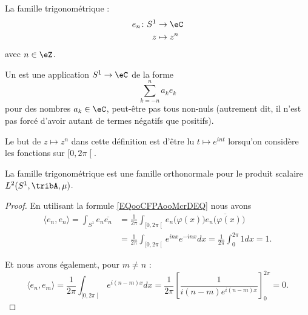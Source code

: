 \begin{definition}
    La famille trigonométrique :
    \begin{equation}
        \begin{aligned}
            e_n\colon S^1&\to \eC \\
            z&\mapsto z^n
        \end{aligned}
    \end{equation}
    avec \( n\in \eZ\).

    Un  est une application \( S^1\to \eC\) de la forme
    \begin{equation}
        \sum_{k=-n}^na_ke_k
    \end{equation}
    pour des nombres \( a_k\in \eC\), peut-être pas tous non-nuls (autrement dit, il n'est pas forcé d'avoir autant de termes négatifs que positifs).
\end{definition}
Le but de \( z\mapsto z^n\) dans cette définition est d'être lu \(  t\mapsto e^{in t}\) lorsqu'on considère les fonctions sur \( \mathopen[ 0 , 2\pi \mathclose[\).

\begin{proposition}
    La famille trigonométrique est une famille orthonormale pour le produit scalaire \( L^2(S^1,\tribA,\mu)\).
\end{proposition}

\begin{proof}
    En utilisant la formule \eqref{EQooCFPAooMcrDEQ} nous avons
    \begin{subequations}
        \begin{align}
            \langle e_n, e_n\rangle =\int_{S^1}e_n\overline{ e_n }&=\frac{1}{ 2\pi }\int_{\mathopen[ 0 , 2\pi \mathclose[}e_n\big( \varphi(x) \big)\overline{ e_n\big( \varphi(x) \big) }\\
                &=\frac{1}{ 2\pi }\int_{\mathopen[ 0 , 2\pi \mathclose[} e^{inx} e^{-inx}dx=\frac{1}{ 2\pi }\int_{0}^{2\pi}1dx=1.
        \end{align}
    \end{subequations}

    Et nous avons également, pour \( m\neq n\) :
    \begin{equation}
        \langle e_n, e_m\rangle =\frac{1}{ 2\pi }\int_{\mathopen[ 0 , 2\pi \mathclose[} e^{i(n-m)x}dx=\frac{1}{ 2\pi }\left[ \frac{1}{ i(n-m) e^{i(n-m)x} } \right]_0^{2\pi}=0.
    \end{equation}
\end{proof}

